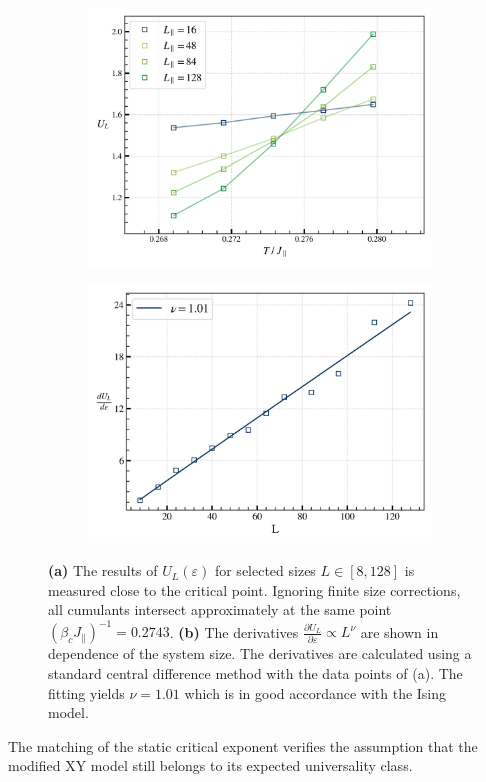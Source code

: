 	\begin{figure}[tbh]
		\begin{subfigure}{0.475\textwidth}
			\centering
			\includegraphics[width=0.95\linewidth]{graphics/slope-at-critical-point-3.png}
		\end{subfigure}
		\begin{subfigure}{0.475\textwidth}
			\centering
			\includegraphics[width=0.95\linewidth]{graphics/nu-2.png}
		\end{subfigure}
		\caption{\textbf{(a)} The results of ${U}_L(\varepsilon)$ for selected sizes $L \in \left[8, 128\right]$ is measured close to the critical point. Ignoring finite size corrections, all cumulants intersect approximately at the same point $(\beta_c J_\parallel)^{-1} = 0.2743$. \textbf{(b)} The derivatives $\frac{\partial U_L}{\partial \varepsilon} \propto L^\nu$ are shown in dependence of the system size. The derivatives are calculated using a standard central difference method with the data points of (a). The fitting yields $\nu = 1.01$ which is in good accordance with the Ising model.}
		\label{Fig::Binder-Cum-Result}
	\end{figure}
	The matching of the static critical exponent verifies the assumption that the modified XY model still belongs to its expected universality class. \\

